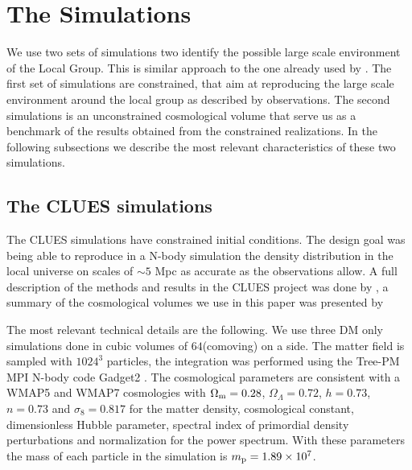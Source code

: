 \documentclass[usenatbib]{latex/mn2e}
\begin{document}
\section{The Simulations}
\label{sec:the_simulations}


We use two sets of simulations two identify the possible large scale 
environment of the Local Group. This is similar approach to the one 
already used by . The first set of simulations are 
constrained, that aim at reproducing the large scale environment around the 
local group as described by observations. The second simulations is an 
unconstrained cosmological volume that serve us as a benchmark of the results 
obtained from the constrained realizations. In the following subsections we 
describe the most relevant characteristics of these two simulations.


\subsection{The CLUES simulations}
\label{subsec:CLUES_simulations}


The CLUES simulations have constrained initial conditions. The design goal 
was being able to reproduce in a N-body simulation the density distribution 
in the local universe on scales of $\sim5$ Mpc as accurate as the 
observations allow. A full description of the methods and results in the 
CLUES project was done by , a summary  of the 
cosmological volumes we use in this paper was presented by 


The most relevant technical details are the following. We use three DM only
simulations done in cubic volumes of $64$\hMpc (comoving) on a side. The 
matter field is sampled with $1024^3$ particles, the integration was 
performed using the Tree-PM MPI N-body code Gadget2 . 
The cosmological parameters are consistent with a WMAP5 and WMAP7 cosmologies 
with $\Omega_{\rm m}=0.28$, $\Omega_{\Lambda}=0.72$, $h=0.73$, $n=0.73$ and 
$\sigma_{8}=0.817$  for the matter density, 
cosmological constant, dimensionless Hubble parameter, spectral index of 
primordial density perturbations and normalization for the power spectrum. 
With these parameters the mass of each particle in the simulation is 
$m_{\rm p}=1.89\times 10^{7}$\hMsun.
\end{document}
